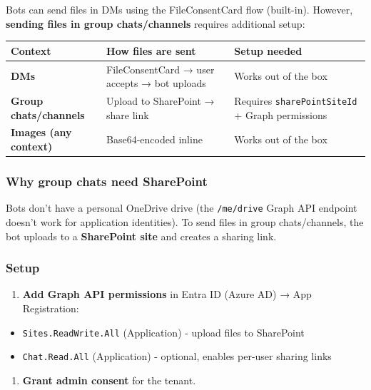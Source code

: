 Bots can send files in DMs using the FileConsentCard flow (built-in). However, \textbf{sending files in group chats/channels} requires additional setup:


\begin{table}[h]
\centering
\small
\begin{tabular}{|l|l|l|}
\hline
Context & How files are sent & Setup needed \\
\hline
\textbf{DMs} & FileConsentCard → user accepts → bot uploads & Works out of the box \\
\hline
\textbf{Group chats/channels} & Upload to SharePoint → share link & Requires \texttt{sharePointSiteId} + Graph permissions \\
\hline
\textbf{Images (any context)} & Base64-encoded inline & Works out of the box \\
\hline
\end{tabular}
\end{table}



\subsubsection{Why group chats need SharePoint}


Bots don't have a personal OneDrive drive (the \texttt{/me/drive} Graph API endpoint doesn't work for application identities). To send files in group chats/channels, the bot uploads to a \textbf{SharePoint site} and creates a sharing link.

\subsubsection{Setup}


\begin{enumerate}
  \item \textbf{Add Graph API permissions} in Entra ID (Azure AD) → App Registration:
\end{enumerate}

\begin{itemize}
  \item \texttt{Sites.ReadWrite.All} (Application) - upload files to SharePoint
  \item \texttt{Chat.Read.All} (Application) - optional, enables per-user sharing links
\end{itemize}


\begin{enumerate}
  \item \textbf{Grant admin consent} for the tenant.
\end{enumerate}


